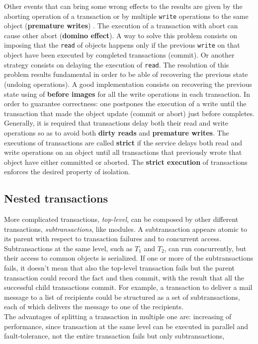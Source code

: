 Other events that can bring some wrong effects to the results are given by the aborting operation of a transaction or by multiple \verb|write| operations to the same object (\textbf{premature writes}) . The execution of a transaction with abort can cause other abort (\textbf{domino effect}). A way to solve this problem consists on imposing that the \verb|read| of objects happens only if the previous \verb|write| on that object have been executed by completed transactions (commit). Or another strategy consists on delaying the execution of \verb|read|. 
The resolution of this problem results fundamental in order to be able of recovering the previous state (undoing operations). A good implementation consists on recovering the previous state using of \textbf{before images} for all the write operations in each transaction. In order to guarantee correctness: one postpones the execution of a write until the transaction that made the object update (commit or abort) just before completes.\\

Generally, it is required that transactions delay both their read and write operations so as to avoid both \textbf{dirty reads} and \textbf{premature writes}. The executions of transactions are called \textbf{strict} if the service delays both read and write operations on an object until all transactions that previously wrote that object have either committed or aborted. The \textbf{strict execution} of transactions enforces the desired property of isolation.

\subsection{Nested transactions}
More complicated transactions, \textit{top-level}, can be composed by other different transactions, \textit{subtransactions}, like modules. A subtransaction appears atomic to its parent with respect to transaction failures and to concurrent access. Subtransactions at the same level, such as $T_1$ and $T_2$, can run concurrently, but their access to common objects is serialized. If one or more of the subtransactions fails, it doesn't mean that also the top-level transaction fails but the parent transaction could record the fact and then commit, with the result that all the successful child transactions commit. For example, a transaction to deliver a mail message to a list of recipients could be structured as a set of subtransactions, each of which delivers the message to one of the recipients.\\
The advantages of splitting a transaction in multiple one are: increasing of performance, since transaction at the same level can be executed in parallel and fault-tolerance, not the entire transaction fails but only subtransactions,

